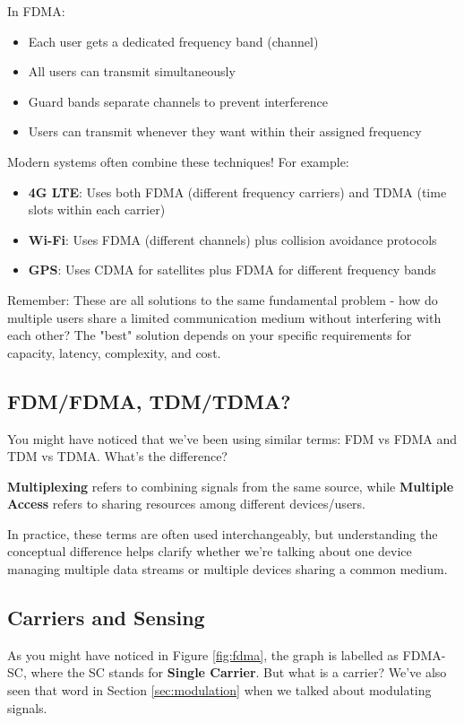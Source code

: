 In FDMA:
\begin{itemize}
    \item Each user gets a dedicated frequency band (channel)
    \item All users can transmit simultaneously
    \item Guard bands separate channels to prevent interference
    \item Users can transmit whenever they want within their assigned frequency
\end{itemize}

Modern systems often combine these techniques! For example:
\begin{itemize}
    \item \textbf{4G LTE}: Uses both FDMA (different frequency carriers) and TDMA (time slots within each carrier)
    \item \textbf{Wi-Fi}: Uses FDMA (different channels) plus collision avoidance protocols
    \item \textbf{GPS}: Uses CDMA for satellites plus FDMA for different frequency bands
\end{itemize}

\begin{importantblock}
    Remember: These are all solutions to the same fundamental problem - how do multiple users share a limited communication medium without interfering with each other? The "best" solution depends on your specific requirements for capacity, latency, complexity, and cost.
\end{importantblock}

\subsection{FDM/FDMA, TDM/TDMA?}
You might have noticed that we've been using similar terms: FDM vs FDMA and TDM vs TDMA. What's the difference?

\begin{importantblock}
    \textbf{Multiplexing} refers to combining signals from the same source, while \textbf{Multiple Access} refers to sharing resources among different devices/users.
\end{importantblock}

In practice, these terms are often used interchangeably, but understanding the conceptual difference helps clarify whether we're talking about one device managing multiple data streams or multiple devices sharing a common medium.

\subsection{Carriers and Sensing}
\label{subsec:carriers_sensing}
As you might have noticed in Figure \ref{fig:fdma}, the graph is labelled as FDMA-SC, where the SC stands for \textbf{Single Carrier}. But what is a carrier? We've also seen that word in Section \ref{sec:modulation} when we talked about modulating signals.

